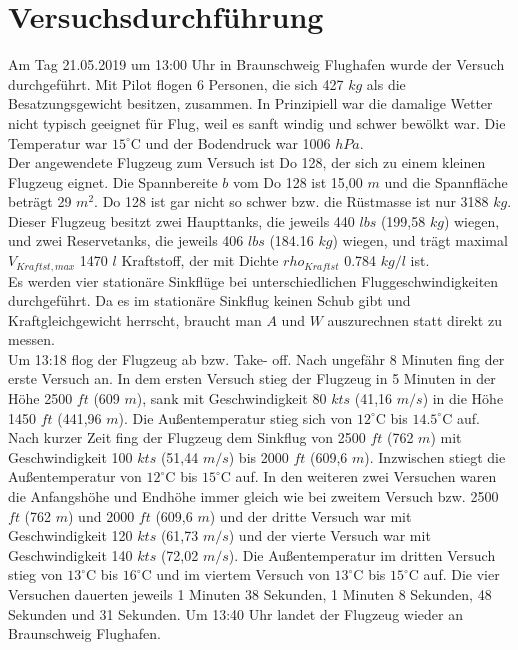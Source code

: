 \chapter{Versuchsdurchführung}
\label{chapter:versuch}
Am Tag 21.05.2019 um 13:00 Uhr in Braunschweig Flughafen wurde der Versuch durchgeführt. Mit Pilot flogen 6 Personen, die sich 427 $kg$ als die Besatzungsgewicht besitzen, zusammen. In Prinzipiell war die damalige Wetter nicht typisch geeignet für Flug, weil es  sanft windig und schwer bewölkt war. Die Temperatur war $15^\circ\text{C}$ und der Bodendruck war 1006 $hPa$. \\
Der angewendete Flugzeug zum Versuch ist Do 128, der sich zu einem kleinen Flugzeug eignet. Die Spannbereite $b$ vom Do 128 ist 15,00 $m$ und die Spannfläche beträgt 29 ${m}^{2}$. Do 128 ist gar nicht so schwer bzw. die Rüstmasse ist nur 3188 $kg$. Dieser Flugzeug besitzt zwei Haupttanks, die jeweils 440 $lbs$ (199,58 $kg$) wiegen, und zwei Reservetanks, die jeweils 406 $lbs$ (184.16 $kg$) wiegen, und trägt maximal $V_{Kraftst,max}$ 1470 $l$ Kraftstoff, der mit Dichte $rho_{Kraftst}$ 0.784 $kg/l$ ist. \\
Es werden vier stationäre Sinkflüge bei unterschiedlichen Fluggeschwindigkeiten durchgeführt. Da  es im stationäre Sinkflug keinen Schub gibt und Kraftgleichgewicht herrscht, braucht man $A$ und $W$ auszurechnen statt direkt zu messen. \\
Um 13:18 flog der Flugzeug ab bzw. Take- off. Nach ungefähr 8 Minuten fing der erste Versuch an. In dem ersten Versuch stieg der Flugzeug in 5 Minuten in der Höhe 2500 $ft$ (609 $m$), sank mit Geschwindigkeit 80 $kts$ (41,16 $m/s$) in die Höhe 1450 $ft$ (441,96 $m$). Die Außentemperatur stieg sich von $12^\circ\text{C}$ bis $14.5^\circ\text{C}$ auf. Nach kurzer Zeit fing der Flugzeug dem Sinkflug von 2500 $ft$ (762 $m$) mit Geschwindigkeit 100 $kts$ (51,44 $m/s$) bis 2000 $ft$ (609,6 $m$). Inzwischen stiegt die Außentemperatur von $12^\circ\text{C}$ bis $15^\circ\text{C}$ auf. In den weiteren zwei Versuchen waren die Anfangshöhe und Endhöhe immer gleich wie bei zweitem Versuch bzw. 2500 $ft$ (762 $m$) und 2000 $ft$ (609,6 $m$) und der dritte Versuch war mit Geschwindigkeit 120 $kts$ (61,73 $m/s$) und der vierte Versuch war mit Geschwindigkeit 140 $kts$ (72,02 $m/s$). Die Außentemperatur im dritten Versuch stieg von $13^\circ\text{C}$ bis $16^\circ\text{C}$ und im viertem Versuch von $13^\circ\text{C}$ bis $15^\circ\text{C}$ auf. Die vier Versuchen dauerten jeweils 1 Minuten 38 Sekunden, 1 Minuten 8 Sekunden, 48 Sekunden und 31 Sekunden. Um 13:40 Uhr landet der Flugzeug wieder an Braunschweig Flughafen.

\newpage
